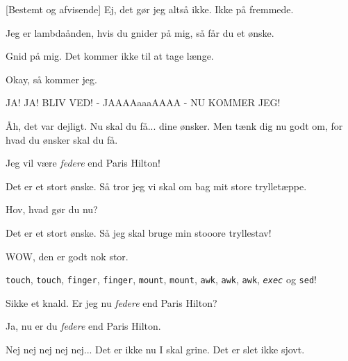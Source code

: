 \documentclass[a4paper,11pt]{article}
\begin{document}
\begin{sketch}
    [Bestemt og afvisende] Ej, det gør jeg altså ikke. Ikke på fremmede.

     Jeg er lambdaånden, hvis du gnider på mig, så får du et ønske.

     Gnid på mig. Det kommer ikke til at tage længe.

     Okay, så kommer jeg.



     JA! JA! BLIV VED! - JAAAAaaaAAAA - NU KOMMER JEG!


     Åh, det var dejligt. Nu skal du få... dine ønsker. Men tænk dig nu
    godt om, for hvad du ønsker skal du få.

     Jeg vil være \emph{federe} end Paris Hilton!

     Det er et stort ønske. Så tror jeg vi skal om bag mit store
    trylletæppe.


     Hov, hvad gør du nu?

     Det er et stort ønske. Så jeg skal bruge min stooore tryllestav!

     WOW, den er godt nok stor.

     \texttt{touch},
    \texttt{touch}, \texttt{finger}, \texttt{finger}, \texttt{mount},
    \texttt{mount}, \texttt{awk}, \texttt{awk}, \texttt{awk},
    \emph{\texttt{exec}} og \texttt{sed}!


     Sikke et knald. Er jeg nu \emph{federe} end Paris Hilton?


     Ja, nu er du \emph{federe} end Paris Hilton.

    
      Nej nej nej nej nej... Det er ikke nu I skal grine. Det er slet ikke sjovt.
    

\end{sketch}
\end{document}
